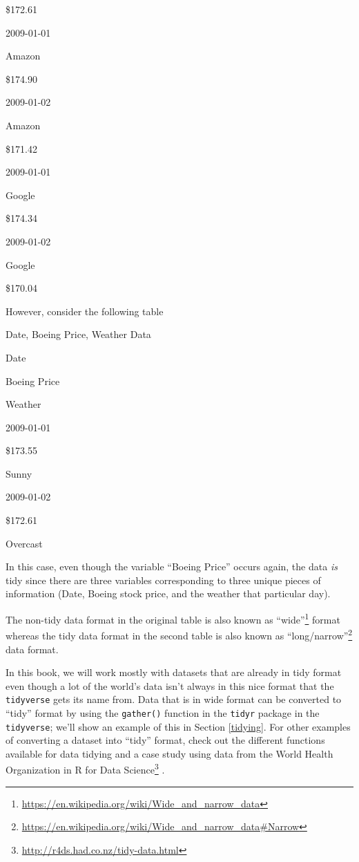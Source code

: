 \documentclass[12pt,]{krantz}
\renewcommand{\href}[2]{#2\footnote{\url{#1}}}
\begin{document}
\$172.61

2009-01-01

Amazon

\$174.90

2009-01-02

Amazon

\$171.42

2009-01-01

Google

\$174.34

2009-01-02

Google

\$170.04

However, consider the following table

\label{tab:unnamed-chunk-63}Date, Boeing Price, Weather Data

Date

Boeing Price

Weather

2009-01-01

\$173.55

Sunny

2009-01-02

\$172.61

Overcast

In this case, even though the variable ``Boeing Price'' occurs again,
the data \emph{is} tidy since there are three variables corresponding to
three unique pieces of information (Date, Boeing stock price, and the
weather that particular day).

The non-tidy data format in the original table is also known as
\href{https://en.wikipedia.org/wiki/Wide_and_narrow_data}{``wide''}
format whereas the tidy data format in the second table is also known as
\href{https://en.wikipedia.org/wiki/Wide_and_narrow_data\#Narrow}{``long/narrow''}
data format.

In this book, we will work mostly with datasets that are already in tidy
format even though a lot of the world's data isn't always in this nice
format that the \texttt{tidyverse} gets its name from. Data that is in
wide format can be converted to ``tidy'' format by using the
\texttt{gather()} function in the \texttt{tidyr} package \citep{R-tidyr}
in the \texttt{tidyverse}; we'll show an example of this in Section
\ref{tidying}. For other examples of converting a dataset into ``tidy''
format, check out the different functions available for data tidying and
a case study using data from the World Health Organization in
\href{http://r4ds.had.co.nz/tidy-data.html}{R for Data Science}
\citep{rds2016}.
\end{document}
